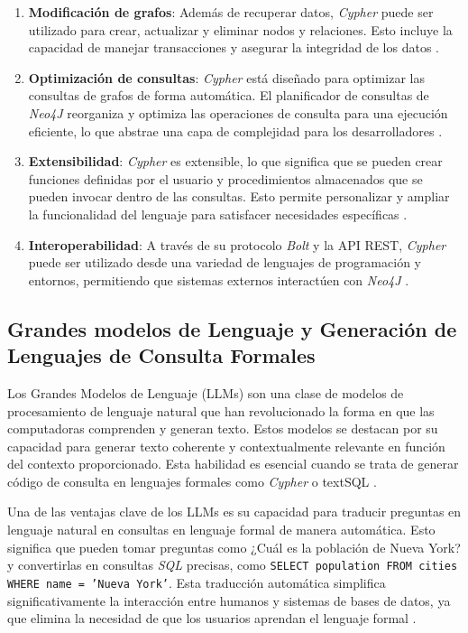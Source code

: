 \begin{enumerate}
\item \textbf{Modificación de grafos}: Además de recuperar datos, \textit{Cypher} puede ser utilizado para crear, actualizar y eliminar nodos y relaciones. Esto incluye la capacidad de manejar transacciones y asegurar la integridad de los datos \cite{vukotic2014}.

\item \textbf{Optimización de consultas}: \textit{Cypher} está diseñado para optimizar las consultas de grafos de forma automática. El planificador de consultas de \textit{Neo4J} reorganiza y optimiza las operaciones de consulta para una ejecución eficiente, lo que abstrae una capa de complejidad para los desarrolladores \cite{neo4jdocs2022}.

\item \textbf{Extensibilidad}: \textit{Cypher} es extensible, lo que significa que se pueden crear funciones definidas por el usuario y procedimientos almacenados que se pueden invocar dentro de las consultas. Esto permite personalizar y ampliar la funcionalidad del lenguaje para satisfacer necesidades específicas \cite{nadkarni2017}.

\item \textbf{Interoperabilidad}: A través de su protocolo \textit{Bolt} y la API REST, \textit{Cypher} puede ser utilizado desde una variedad de lenguajes de programación y entornos, permitiendo que sistemas externos interactúen con \textit{Neo4J} \cite{partnerandfaircloth2019}.

\end{enumerate}

\subsection{Grandes modelos de Lenguaje y Generación de Lenguajes de Consulta Formales} \label{llms_prelude}

Los Grandes Modelos de Lenguaje (LLMs) son una clase de modelos de procesamiento de lenguaje natural que han revolucionado la forma en que las computadoras comprenden y generan texto. Estos modelos se destacan por su capacidad para generar texto coherente y contextualmente relevante en función del contexto proporcionado. Esta habilidad es esencial cuando se trata de generar código de consulta en lenguajes formales como \textit{Cypher} o text{SQL} \cite{brownetal2020}.

Una de las ventajas clave de los LLMs es su capacidad para traducir preguntas en lenguaje natural en consultas en lenguaje formal de manera automática. Esto significa que pueden tomar preguntas como \guillemotleft ¿Cuál es la población de Nueva York? \guillemotleft y convertirlas en consultas \textit{SQL} precisas, como \texttt{SELECT population FROM cities WHERE name = 'Nueva York'}. Esta traducción automática simplifica significativamente la interacción entre humanos y sistemas de bases de datos, ya que elimina la necesidad de que los usuarios aprendan el lenguaje formal \cite{mehrietal2019}.

